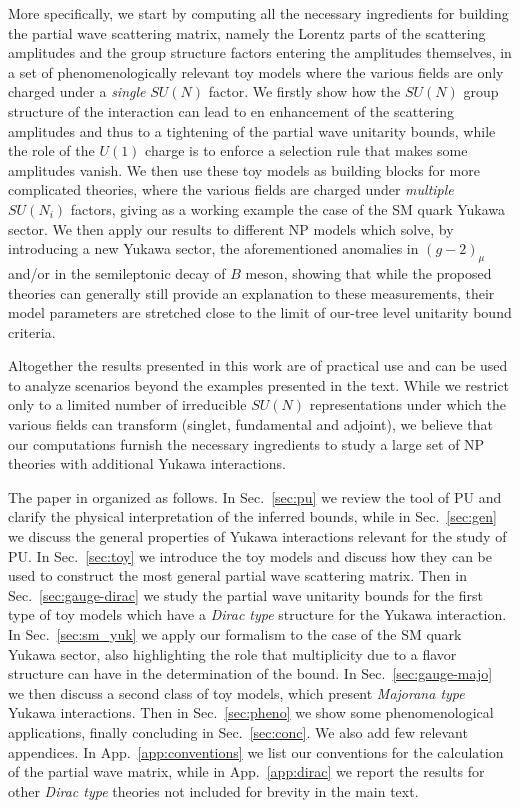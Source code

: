 \documentclass[a4paper,11pt]{article}
\begin{document}
More specifically, we start by computing all the necessary ingredients for building the partial wave scattering matrix, namely the Lorentz parts of the scattering amplitudes and the group structure factors entering the amplitudes themselves, in a set of phenomenologically relevant toy models where the various fields are only charged under a {\emph{single}} $SU(N)$ factor.
We firstly show how the $SU(N)$ group structure of the interaction can lead to en 
enhancement of the scattering amplitudes  and thus to a tightening of the partial wave unitarity bounds, while the role of the $U(1)$ charge is to enforce a selection rule that makes some amplitudes vanish. We then use these toy models as building blocks for more complicated theories, where the various fields are charged under {\emph{multiple}} $SU(N_i)$ factors, giving as a working example the case of the SM quark Yukawa sector.
We then apply our results to different NP models which solve, by introducing a new Yukawa sector, the aforementioned anomalies in $(g-2)_\mu$ and/or in the semileptonic decay of $B$ meson, showing that while the proposed theories can generally still provide an explanation to these measurements, their model parameters are stretched close to the limit of our-tree level unitarity bound criteria.




Altogether the results presented in this work are of practical use and can be used to analyze scenarios beyond the examples presented in the text.  While we restrict only to a limited number of irreducible $SU(N)$ representations under which the various fields can transform (singlet, fundamental and adjoint), we believe that our computations furnish the necessary ingredients to study a large set of NP theories with additional Yukawa interactions.



The paper in organized as follows. In Sec.~\ref{sec:pu} we review the tool of PU and clarify the physical interpretation of the inferred bounds, while in Sec.~\ref{sec:gen} we discuss the general properties of Yukawa interactions relevant for the study of PU. In Sec.~\ref{sec:toy} we introduce the toy models and discuss how they can be used to construct the most general partial wave scattering matrix. Then in Sec.~\ref{sec:gauge-dirac} we study the partial wave unitarity bounds for the first type of toy models which have a {\emph{Dirac type}} structure for the Yukawa interaction. In Sec.~\ref{sec:sm_yuk} we apply
our formalism to the case of the SM quark Yukawa sector, also highlighting the role that multiplicity due to a flavor structure can have in the determination of the bound. In Sec.~\ref{sec:gauge-majo} we then discuss a second class of toy models, which present {\emph{Majorana type}} Yukawa interactions.
Then in Sec.~\ref{sec:pheno} we show some phenomenological applications, finally  concluding in Sec.~\ref{sec:conc}.  We also add few relevant appendices. In App.~\ref{app:conventions} we list our conventions for the calculation of the partial wave matrix, while in App.~\ref{app:dirac} we report the results for other {\emph{Dirac type}} theories not included for brevity in the main text.
\end{document}
